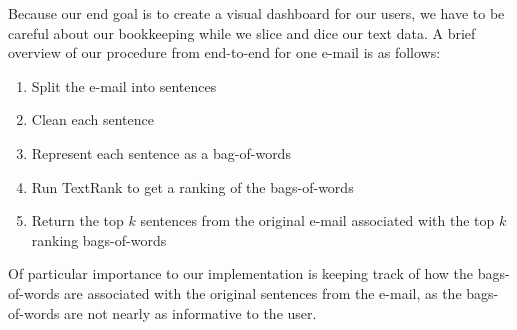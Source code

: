 Because our end goal is to create a visual dashboard for our users, we have to be careful about our bookkeeping while we slice and dice our text data. 
A brief overview of our procedure from end-to-end for one e-mail is as follows:
\begin{enumerate}
\item Split the e-mail into sentences
\item Clean each sentence
\item Represent each sentence as a bag-of-words
\item Run TextRank to get a ranking of the bags-of-words
\item Return the top $k$ sentences from the original e-mail associated with the top $k$ ranking bags-of-words
\end{enumerate}

Of particular importance to our implementation is keeping track of how the bags-of-words are associated with the original sentences from the e-mail, as the bags-of-words are not nearly as informative to the user.